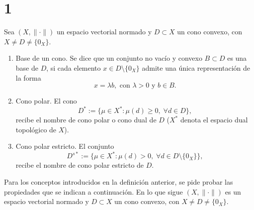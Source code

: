 \section*{1}

\begin{definition}
    Sea $(X, \| \cdot \|)$ un espacio vectorial normado y $D \subset X$ un cono convexo,
    con $X \neq D \neq \{ 0_X \}$.
    \begin{enumerate}[label=\textup{(\alph*)}]
        \item Base de un cono.
            \textup{
                Se dice que un conjunto no vacío y convexo $B \subset D$ es una base de $D$,
                si cada elemento $x \in D \setminus \{ 0_X \}$ admite una única representación de la forma
                \begin{equation*}
                    x = \lambda b, \text{ con } \lambda > 0 \text{ y } b \in B.
                \end{equation*}
            }

        \item Cono polar.
            \textup{
                El cono
                \begin{equation*}
                    D^* := \{ \mu \in X^* : \mu(d) \geq 0, \; \forall d \in D \},
                \end{equation*}
                recibe el nombre de cono polar o cono dual de $D$
                ($X^*$ denota el espacio dual topológico de $X$).
            }
        \item Cono polar estricto.
            \textup{
                El conjunto 
                \begin{equation*}
                    D^{s*} := \{ \mu \in X^* : \mu(d) > 0, \; \forall d \in D \setminus \{ 0_X \} \},
                \end{equation*}
                recibe el nombre de cono polar estricto de $D$.
            }
    \end{enumerate}
\end{definition}

Para los conceptos introducidos en la definición anterior,
se pide probar las propiedades que se indican a continuación.
En lo que sigue $(X, \| \cdot \|)$ es un espacio vectorial normado y $D \subset X$ un cono convexo, con $X \neq D \neq \{ 0_X \}$.

